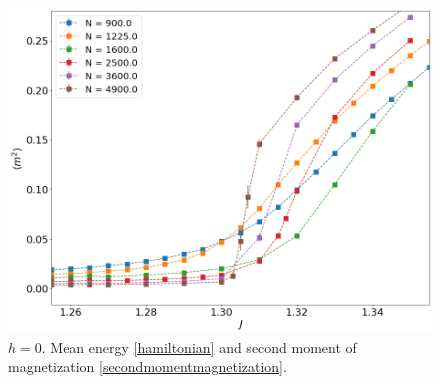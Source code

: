 \begin{figure}[H]
	\includegraphics[scale=0.23]{Images/magnetization2_longchains.png}
	\caption{$h=0$. Mean energy \eqref{hamiltonian} and   second moment of magnetization \eqref{secondmomentmagnetization}. }
	\label{fig:energymagshort}
\end{figure}

